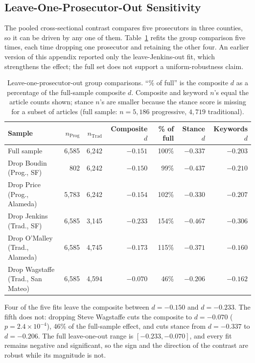 \documentclass[12pt, letterpaper]{article}
\begin{document}
\begin{appendices}
\section{Leave-One-Prosecutor-Out Sensitivity}
\label{app:baseline_sensitivity}

The pooled cross-sectional contrast compares five prosecutors in three counties, so it can be driven by any one of them. Table~\ref{tab:leave_one_out} refits the group comparison five times, each time dropping one prosecutor and retaining the other four. An earlier version of this appendix reported only the leave-Jenkins-out fit, which strengthens the effect; the full set does not support a uniform-robustness claim.

\begin{table}[H]
\centering
\small
\setlength{\tabcolsep}{4.0pt}
\caption{Leave-one-prosecutor-out group comparisons. ``\% of full'' is the composite $d$ as a percentage of the full-sample composite $d$. Composite and keyword $n$'s equal the article counts shown; stance $n$'s are smaller because the stance score is missing for a subset of articles (full sample: $n = 5{,}186$ progressive, $4{,}719$ traditional).}
\label{tab:leave_one_out}
\begin{tabular}{lrrrrrr}
\toprule
Sample & $n_{\text{Prog}}$ & $n_{\text{Trad}}$ & Composite $d$ & \% of full & Stance $d$ & Keywords $d$ \\
\midrule
Full sample & 6{,}585 & 6{,}242 & $-0.151$ & 100\% & $-0.337$ & $-0.203$ \\
\midrule
Drop Boudin (Prog., SF) & 802 & 6{,}242 & $-0.150$ & 99\% & $-0.437$ & $-0.210$ \\
Drop Price (Prog., Alameda) & 5{,}783 & 6{,}242 & $-0.154$ & 102\% & $-0.330$ & $-0.207$ \\
Drop Jenkins (Trad., SF) & 6{,}585 & 3{,}145 & $-0.233$ & 154\% & $-0.467$ & $-0.306$ \\
Drop O'Malley (Trad., Alameda) & 6{,}585 & 4{,}745 & $-0.173$ & 115\% & $-0.371$ & $-0.160$ \\
Drop Wagstaffe (Trad., San Mateo) & 6{,}585 & 4{,}594 & $-0.070$ & 46\% & $-0.206$ & $-0.162$ \\
\bottomrule
\end{tabular}
\end{table}

Four of the five fits leave the composite between $d = -0.150$ and $d = -0.233$. The fifth does not: dropping Steve Wagstaffe cuts the composite to $d = -0.070$ ($p = 2.4 \times 10^{-4}$), 46\% of the full-sample effect, and cuts stance from $d = -0.337$ to $d = -0.206$. The full leave-one-out range is $[-0.233, -0.070]$, and every fit remains negative and significant, so the sign and the direction of the contrast are robust while its magnitude is not.


\end{appendices}
\end{document}
